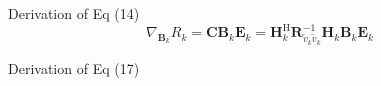 \documentclass[aspectratio=169, 10pt]{beamer}
\begin{document}
\begin{frame}[label=app-wsr_Ri]{Derivation of Eq (14)}
    \begin{equation*}
        \nabla_{\mathbf{B}_k} R_k = \mathbf{C} \mathbf{B}_k \mathbf{E}_k = \mathbf{H}_k^\mathrm{H} \mathbf{R}_{\tilde{v}_k\tilde{v}_k}^{-1} \mathbf{H}_k \mathbf{B}_k \mathbf{E}_k
    \end{equation*}


    \begin{flushright}
        \hyperlink{main-wsr_Ri}{}
    \end{flushright}

    \vspace{-9ex}
\end{frame}

\begin{frame}[label=app-wsr_Ri2]{Derivation of Eq (17)}


\end{frame}
\end{document}
